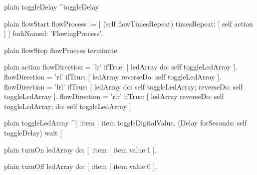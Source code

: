 \documentclass[10pt,twoside,english]{_support/latex/sbabook/sbabook}
\begin{document}
\begin{displaycode}{plain}
toggleDelay
	 ^toggleDelay
\end{displaycode}

\begin{displaycode}{plain}
flowStart
	flowProcess := [ (self flowTimesRepeat) timesRepeat: [
          self action
      ] ] forkNamed: 'FlowingProcess'.
\end{displaycode}

\begin{displaycode}{plain}
flowStop
	flowProcess terminate
\end{displaycode}

\begin{displaycode}{plain}
action
	flowDirection = 'lr' ifTrue: [  ledArray do: self toggleLedArray ].
	flowDirection = 'rl' ifTrue: [  ledArray reverseDo: self toggleLedArray ].
	flowDirection = 'lrl' ifTrue: [  ledArray do: self toggleLedArray; reverseDo: self toggleLedArray ].
	flowDirection = 'rlr' ifTrue: [  ledArray reverseDo: self toggleLedArray; do: self toggleLedArray ]
\end{displaycode}

\begin{displaycode}{plain}
toggleLedArray
	^[ :item | item toggleDigitalValue. (Delay forSeconds: self toggleDelay) wait ]
\end{displaycode}

\begin{displaycode}{plain}
turnOn
	ledArray do: [ :item | item value:1 ].
\end{displaycode}

\begin{displaycode}{plain}
turnOff
	ledArray do: [ :item | item value:0 ].
\end{displaycode}


\backmatter

\end{document}

